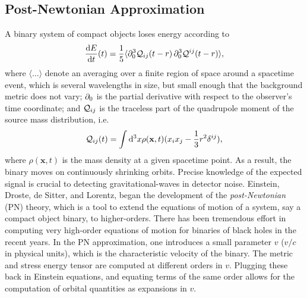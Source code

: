 \subsection{Post-{N}ewtonian Approximation}
\label{sec:PNWaveforms}

A binary system of compact objects loses energy according to 
%
\begin{equation}
\label{eq:energy_loss}
\frac{\D E}{\D t}(t) = \frac{1}{5}\langle \pd_0^3\Quad_{ij}(t-r)\,\pd_0^3\Quad^{ij}(t-r)\rangle,
\end{equation}
%
where $\langle\dots\rangle$ denote an averaging over a finite region
of space around a spacetime event, which is several wavelengths in size,
but small enough that the background metric does not vary;
% 
$\partial_0$ is the partial derivative with respect to the observer's
time coordinate; and $\mathcal{Q}_{ij}$ is the traceless part of the quadrupole 
moment of the source mass distribution, i.e.
%
\begin{equation}
\mathcal{Q}_{ij}(t) = \int \mathrm{d}^3 x \rho(\mathbf{x},t)(x_i x_j - \frac{1}{3}r^2 \delta^{ij}),
\end{equation}
% 
where $\rho(\mathbf{x},t)$ is the mass density at a given spacetime point.
As a result, the binary moves on continuously shrinking orbits.
Precise knowledge of the expected signal is crucial to detecting gravitational-waves
in detector noise. Einstein, Droste, de Sitter, and Lorentz,
began the development of the {\it post-Newtonian} (PN) theory, which is a
tool to extend the equations of motion of a system, say a compact object 
binary, to higher-orders. There has been tremendous effort in computing 
very high-order equations of motion for binaries of black holes in the
recent years. In the PN approximation, one introduces a small parameter 
$v$ ($v/c$ in physical units), which is the characteristic velocity of the binary.
The metric and
stress energy tensor are computed at different orders in 
$v$. Plugging these back in Einstein equations, and equating terms of 
the same order allows for the computation of orbital quantities
as expansions in $v$. 


